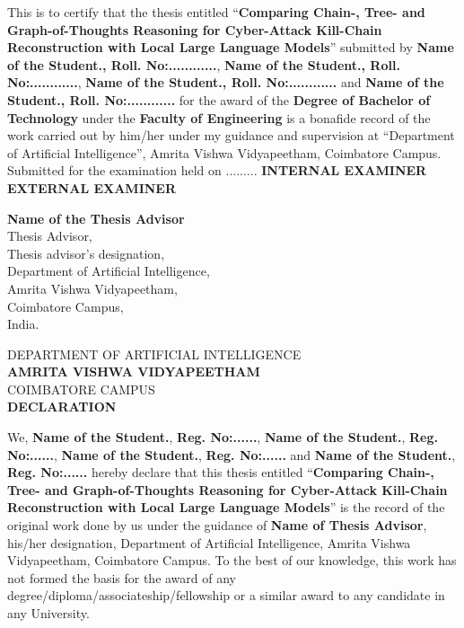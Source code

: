 \documentclass[a4paper, 12pt]{report}
\theoremstyle{definition}
\begin{document}
	\vspace*{.8cm}
	\noindent This is to certify that the thesis entitled \enquote{\textbf{Comparing Chain-, Tree- and Graph-of-Thoughts Reasoning for Cyber-Attack Kill-Chain Reconstruction with Local Large Language Models}} submitted by \textbf{Name of the Student., Roll. No:............}, \textbf{Name of the Student., Roll. No:............}, \textbf{Name of the Student., Roll. No:............} and \textbf{Name of the Student., Roll. No:............} for the award of the \textbf{Degree of Bachelor of Technology} under the \textbf{Faculty of Engineering} is a bonafide record of the work carried out by him/her under my guidance and supervision at \enquote{Department of Artificial Intelligence}, Amrita Vishwa Vidyapeetham, Coimbatore Campus.\\
    \vfill
    Submitted for the examination held on .........
    \vfill
    \textbf{INTERNAL EXAMINER}    \hspace{5cm}      \textbf{EXTERNAL EXAMINER}
    \vfill
\begin{center}
		\textbf{Name of the Thesis Advisor}\\
	Thesis Advisor,\\
	Thesis advisor's designation,\\
	Department of Artificial Intelligence,\\
	Amrita Vishwa Vidyapeetham,\\
	Coimbatore Campus,\\
	India.
\end{center}

	\newpage
	\begin{center}
	{\large DEPARTMENT OF ARTIFICIAL INTELLIGENCE}\\
	\Large{ \textbf{AMRITA VISHWA VIDYAPEETHAM}}\\

	{\large COIMBATORE CAMPUS}\\


		\vspace*{2.5cm}
		\large {\textbf{DECLARATION}}
		\vspace*{.3cm}
	\end{center}

	\noindent We,\textbf{ Name of the Student.},  \textbf{Reg. No:......}, \textbf{ Name of the Student.},  \textbf{Reg. No:......}, \textbf{ Name of the Student.},  \textbf{Reg. No:......} and \textbf{ Name of the Student.},  \textbf{Reg. No:......} hereby declare that this thesis entitled \enquote{\textbf{Comparing Chain-, Tree- and Graph-of-Thoughts Reasoning for Cyber-Attack Kill-Chain Reconstruction with Local Large Language Models}} is the record of the original work done by us under the guidance of \textbf{Name of Thesis Advisor}, his/her designation, Department of Artificial Intelligence, Amrita Vishwa Vidyapeetham, Coimbatore Campus. To the best of our knowledge, this work has not formed the basis for the award of any degree/diploma/associateship/fellowship or a similar award to any candidate in any University.\\\\
\end{document}
